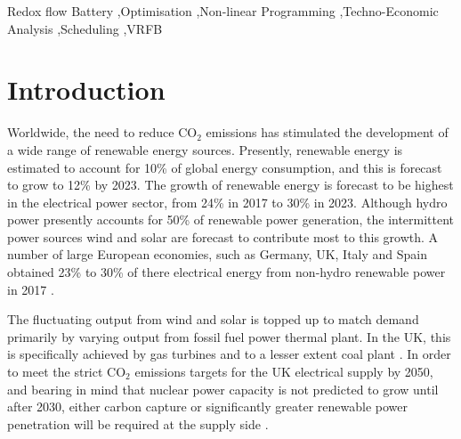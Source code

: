 \documentclass[preprint,3p,review,authoryear,10pt]{elsarticle}
\begin{document}
\begin{frontmatter}
\begin{abstract}
\end{abstract}

\begin{keyword}
Redox flow Battery \sep Optimisation \sep Non-linear Programming \sep Techno-Economic Analysis \sep Scheduling \sep VRFB  


\end{keyword}

\end{frontmatter}


\section{Introduction}
\label{sec:Intro}
Worldwide, the need to reduce CO$_2$ emissions has stimulated the development of a wide range of renewable energy sources. Presently, renewable energy is estimated to account for 10\% of global energy consumption, and this is forecast to grow to 12\% by 2023. The growth of renewable energy is forecast to be highest in the electrical power sector, from 24\% in 2017 to 30\% in 2023. Although hydro power presently accounts for 50\% of renewable power generation, the  intermittent power sources wind and solar are forecast to contribute most to this growth\cite{IEA2018}. A number of large European economies, such as Germany, UK, Italy and Spain obtained 23\% to 30\% of there electrical energy from non-hydro renewable power in 2017 \cite{BP2018}.

The fluctuating output from wind and solar is topped up to match demand primarily by varying output from fossil fuel power thermal plant. In the UK, this is specifically achieved by gas turbines and to a lesser extent coal plant \cite{DraxElectricInsights}. In order to meet the strict CO$_2$ emissions targets for the UK electrical supply by 2050, and bearing in mind that nuclear power capacity is not predicted to grow until after 2030, either carbon capture or significantly greater renewable power penetration will be required at the supply side \cite{FES2018}.
\end{document}
